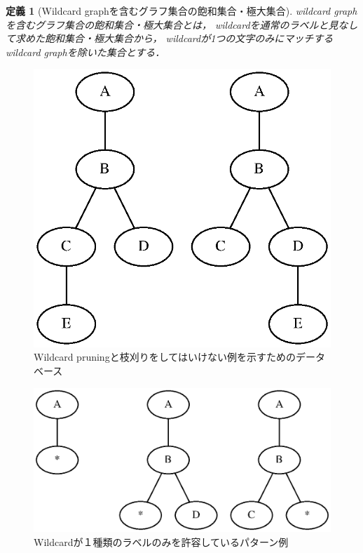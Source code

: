 \documentclass[12pt,fleqn]{jsotsuron}
\newtheorem{Definition}{定義}
\begin{document}
\begin{Definition}[Wildcard graphを含むグラフ集合の飽和集合・極大集合]
wildcard graphを含むグラフ集合の飽和集合・極大集合とは，
wildcardを通常のラベルと見なして求めた飽和集合・極大集合から，
wildcardが1つの文字のみにマッチするwildcard graphを除いた集合とする．

\end{Definition}
\begin{figure}[t]
\begin{center}
\includegraphics[scale = 0.28]{fig/wildprun.eps}
\end{center}
\caption{Wildcard pruningと枝刈りをしてはいけない例を示すためのデータベース}
\label{fig:wild}
\end{figure}
\begin{figure}[t]
\begin{center}
\includegraphics[scale = 0.28]{fig/wip-true.eps}
\end{center}
\caption{Wildcardが１種類のラベルのみを許容しているパターン例}
\label{fig:wipt}
\end{figure}
\end{document}
